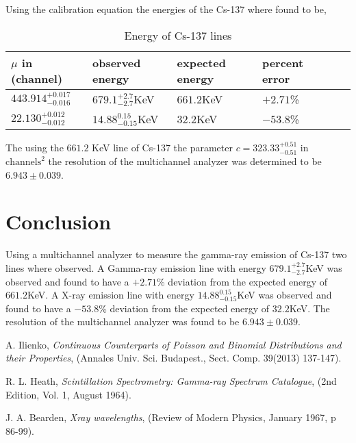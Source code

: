 \documentclass[%
 reprint,
 amsmath,amssymb,
 aps,
]{revtex4-1}
\begin{document}
Using the calibration equation the energies of the Cs-137 where found to be,

\begin{table}[!htbp]
\centering
\caption{Energy of Cs-137 lines}
\begin{tabular}{|l|l|l|l|l|l|}
\hline
$\mu$ in (channel) & observed energy & expected energy & percent error \\ \hline
$443.914_{-0.016}^{+0.017}$ & $679.1_{-2.7}^{+2.7}$KeV & $661.2$KeV & $+2.71$\% \\ \hline
$22.130_{-0.012}^{+0.012}$ & $14.88_{-0.15}^{0.15}$KeV & $32.2$KeV & $-53.8$\% \\ \hline
\end{tabular}
\end{table}

The using the $661.2$ KeV line of Cs-137 the parameter $c=323.33_{-0.51}^{+0.51}$ in $\text{channels}^2$ the resolution of the multichannel analyzer was determined to be $6.943\pm0.039$.

\section{Conclusion}
Using a multichannel analyzer to measure the gamma-ray emission of Cs-137 two lines where observed. A Gamma-ray emission line with energy $679.1_{-2.7}^{+2.7}$KeV was observed and found to have a $+2.71$\% deviation from the expected energy of $661.2$KeV. A X-ray emission line with energy $14.88_{-0.15}^{0.15}$KeV was observed and found to have a $-53.8$\% deviation from the expected energy of $32.2$KeV. The resolution of the multichannel analyzer was found to be $6.943\pm0.039$.

\pagebreak

\begin{thebibliography}{1}

 A. Ilienko, \textit{Continuous Counterparts of Poisson and Binomial Distributions and their Properties}, (Annales Univ. Sci. Budapest., Sect. Comp. 39(2013) 137-147).

 R. L. Heath, \textit{Scintillation Spectrometry: Gamma-ray Spectrum Catalogue}, (2nd Edition, Vol. 1, August 1964).

 J. A. Bearden, \textit{Xray wavelengths}, (Review of Modern Physics, January 1967, p 86-99).

\end{thebibliography}
 
\end{document}
